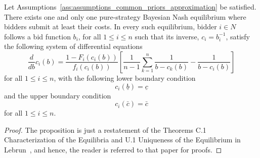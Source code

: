 \begin{propositiona}[\ref{prop:characterization_of_the_equilibrium_in_common_priors_setting_approximation}]
Let Assumptions~\ref{ass:assumptions_common_priors_approximation} be satisfied. There exists one and only one pure-strategy Bayesian Nash equilibrium where bidders submit at least their costs. In every such equilibrium, bidder $i\in N$ follows a bid function $b_i$, for all $1\leq i\leq n$ such that its inverse, $c_i= b_i^{-1}$, satisfy the following system of differential equations
\begin{equation}
  \frac{d}{db}c_i(b) = \frac{1 - F_i(c_i(b))}{f_i(c_i(b))}\left[ \frac{1}{n-1}\sum_{k=1}^n \frac{1}{b-c_k(b)} - \frac{1}{b-c_i(b)} \right]
\end{equation}
for all $1\leq i\leq n$, with the following lower boundary condition
\begin{equation}
  c_i(\underline{b}) = \underline{c}
\end{equation}
and the upper boundary condition
\begin{equation}
  c_i(\bar{c}) = \bar{c}
\end{equation}
for all $1\leq i\leq n$.
\end{propositiona}
\begin{proof}
The proposition is just a restatement of the Theorems C.1 Characterization of the Equilibria and U.1 Uniqueness of the Equilibrium in Lebrun~\cite{Lebrun2006}, and hence, the reader is referred to that paper for proofs.
\end{proof}
